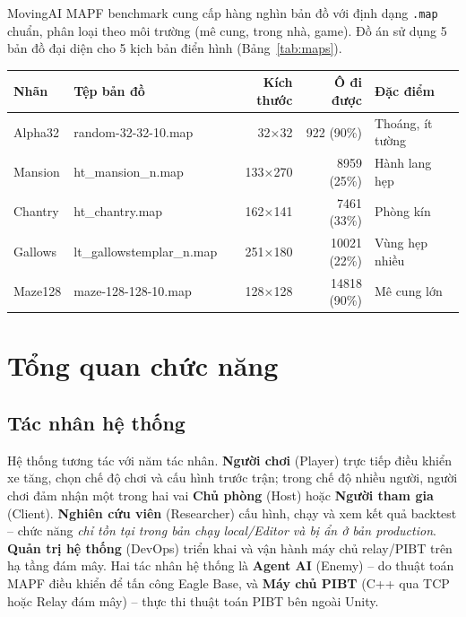 \documentclass[../DoAn.tex]{subfiles}
\begin{document}
MovingAI MAPF benchmark \cite{sturtevant2012benchmarks} cung cấp hàng nghìn bản đồ
với định dạng \texttt{.map} chuẩn, phân loại theo môi trường (mê cung, trong nhà, game).
Đồ án sử dụng 5 bản đồ đại diện cho 5 kịch bản điển hình (Bảng~\ref{tab:maps}).

\begin{center}
\label{tab:maps}
\small
\begin{tabular}{llrrl}
\hline
\textbf{Nhãn} & \textbf{Tệp bản đồ}            & \textbf{Kích thước} & \textbf{Ô đi được} & \textbf{Đặc điểm} \\ \hline
Alpha32   & random-32-32-10.map       & 32×32     & 922  (90\%)  & Thoáng, ít tường  \\
Mansion   & ht\_mansion\_n.map        & 133×270   & 8959 (25\%)  & Hành lang hẹp     \\
Chantry   & ht\_chantry.map           & 162×141   & 7461 (33\%)  & Phòng kín         \\
Gallows   & lt\_gallowstemplar\_n.map & 251×180   & 10021 (22\%) & Vùng hẹp nhiều     \\
Maze128   & maze-128-128-10.map       & 128×128   & 14818 (90\%) & Mê cung lớn       \\ \hline
\end{tabular}
\end{center}

\section{Tổng quan chức năng}
\label{section:2.2}

\subsection{Tác nhân hệ thống}
\label{subsection:2.2.1}

Hệ thống tương tác với năm tác nhân. \textbf{Người chơi} (Player) trực tiếp điều khiển
xe tăng, chọn chế độ chơi và cấu hình trước trận; trong chế độ nhiều người, người chơi
đảm nhận một trong hai vai \textbf{Chủ phòng} (Host) hoặc \textbf{Người tham gia} (Client).
\textbf{Nghiên cứu viên} (Researcher) cấu hình, chạy và xem kết quả backtest -- chức năng
\emph{chỉ tồn tại trong bản chạy local/Editor và bị ẩn ở bản production}. \textbf{Quản trị
hệ thống} (DevOps) triển khai và vận hành máy chủ relay/PIBT trên hạ tầng đám mây. Hai
tác nhân hệ thống là \textbf{Agent AI} (Enemy) -- do thuật toán MAPF điều khiển để tấn
công Eagle Base, và \textbf{Máy chủ PIBT} (C++ qua TCP hoặc Relay đám mây) -- thực thi
thuật toán PIBT bên ngoài Unity.
\end{document}
